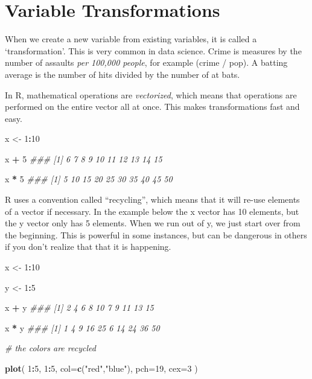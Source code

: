 \documentclass[]{book}
\newenvironment{Shaded}{\begin{snugshade}}{\end{snugshade}}
\newcommand{\CommentTok}[1]{\textcolor[rgb]{0.56,0.35,0.01}{\textit{#1}}}
\newcommand{\DataTypeTok}[1]{\textcolor[rgb]{0.13,0.29,0.53}{#1}}
\newcommand{\DecValTok}[1]{\textcolor[rgb]{0.00,0.00,0.81}{#1}}
\newcommand{\KeywordTok}[1]{\textcolor[rgb]{0.13,0.29,0.53}{\textbf{#1}}}
\newcommand{\NormalTok}[1]{#1}
\newcommand{\OperatorTok}[1]{\textcolor[rgb]{0.81,0.36,0.00}{\textbf{#1}}}
\newcommand{\StringTok}[1]{\textcolor[rgb]{0.31,0.60,0.02}{#1}}
\theoremstyle{definition}
\theoremstyle{definition}
\theoremstyle{definition}
\theoremstyle{remark}
\begin{document}
\hypertarget{variable-transformations}{%
\section{Variable Transformations}\label{variable-transformations}}

When we create a new variable from existing variables, it is called a
`transformation'. This is very common in data science. Crime is measures
by the number of assaults \emph{per 100,000 people}, for example (crime
/ pop). A batting average is the number of hits divided by the number of
at bats.

In R, mathematical operations are \emph{vectorized}, which means that
operations are performed on the entire vector all at once. This makes
transformations fast and easy.

\begin{Shaded}
\begin{Highlighting}[]

\NormalTok{x <-}\StringTok{ }\DecValTok{1}\OperatorTok{:}\DecValTok{10}

\NormalTok{x }\OperatorTok{+}\StringTok{ }\DecValTok{5}
\CommentTok{###  [1]  6  7  8  9 10 11 12 13 14 15}

\NormalTok{x }\OperatorTok{*}\StringTok{ }\DecValTok{5}
\CommentTok{###  [1]  5 10 15 20 25 30 35 40 45 50}
\end{Highlighting}
\end{Shaded}

R uses a convention called ``recycling'', which means that it will
re-use elements of a vector if necessary. In the example below the x
vector has 10 elements, but the y vector only has 5 elements. When we
run out of y, we just start over from the beginning. This is powerful in
some instances, but can be dangerous in others if you don't realize that
that it is happening.

\begin{Shaded}
\begin{Highlighting}[]

\NormalTok{x <-}\StringTok{ }\DecValTok{1}\OperatorTok{:}\DecValTok{10}

\NormalTok{y <-}\StringTok{ }\DecValTok{1}\OperatorTok{:}\DecValTok{5}

\NormalTok{x }\OperatorTok{+}\StringTok{ }\NormalTok{y}
\CommentTok{###  [1]  2  4  6  8 10  7  9 11 13 15}

\NormalTok{x }\OperatorTok{*}\StringTok{ }\NormalTok{y}
\CommentTok{###  [1]  1  4  9 16 25  6 14 24 36 50}

\CommentTok{# the colors are recycled}

\KeywordTok{plot}\NormalTok{( }\DecValTok{1}\OperatorTok{:}\DecValTok{5}\NormalTok{, }\DecValTok{1}\OperatorTok{:}\DecValTok{5}\NormalTok{, }\DataTypeTok{col=}\KeywordTok{c}\NormalTok{(}\StringTok{"red"}\NormalTok{,}\StringTok{"blue"}\NormalTok{), }\DataTypeTok{pch=}\DecValTok{19}\NormalTok{, }\DataTypeTok{cex=}\DecValTok{3}\NormalTok{ )}
\end{Highlighting}
\end{Shaded}
\end{document}
